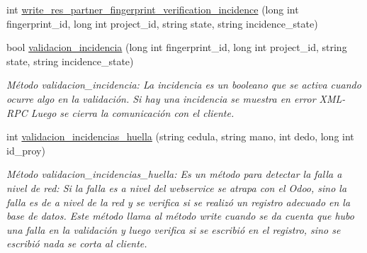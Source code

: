 \begin{DoxyCompactItemize}
int \hyperlink{classestado__proyecto_a6785dec0403ee8c1ed4c659f7fbf7109}{write\+\_\+res\+\_\+partner\+\_\+fingerprint\+\_\+verification\+\_\+incidence} (long int fingerprint\+\_\+id, long int project\+\_\+id, string state, string incidence\+\_\+state)
\item 
bool \hyperlink{classestado__proyecto_a01259da662364a21bbc7f485025af9ad}{validacion\+\_\+incidencia} (long int fingerprint\+\_\+id, long int project\+\_\+id, string state, string incidence\+\_\+state)
\begin{DoxyCompactList}\small\item\em Método validacion\+\_\+incidencia\+: La incidencia es un booleano que se activa cuando ocurre algo en la validación. Si hay una incidencia se muestra en error X\+M\+L-\/\+R\+PC Luego se cierra la comunicación con el cliente. \end{DoxyCompactList}\item 
int \hyperlink{classestado__proyecto_a80aae285a18e7e7b1e97ee14dcc5c366}{validacion\+\_\+incidencias\+\_\+huella} (string cedula, string mano, int dedo, long int id\+\_\+proy)
\begin{DoxyCompactList}\small\item\em Método validacion\+\_\+incidencias\+\_\+huella\+: Es un método para detectar la falla a nivel de red\+: Si la falla es a nivel del webservice se atrapa con el Odoo, sino la falla es de a nivel de la red y se verifica si se realizó un registro adecuado en la base de datos. Este método llama al método write cuando se da cuenta que hubo una falla en la validación y luego verifica si se escribió en el registro, sino se escribió nada se corta al cliente. \end{DoxyCompactList}\end{DoxyCompactItemize}
